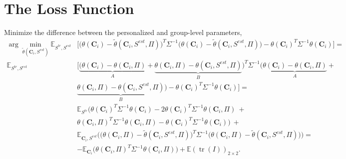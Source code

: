 \documentclass[12pt]{article}
\begin{document}
\section{The Loss Function}\label{app_loss}
Minimize the difference between the personalized and group-level parameters, 
\begin{align} \label{eq_loss}
   \arg\min_{\widetilde{\theta}(\mathbf{C}_i, S^{est})}  \mathbb{E}_{S^{tr}, S^{est}} & \bigg[\big(\theta(\mathbf{C}_i) - \widetilde{\theta}(\mathbf{C}_i, S^{est}, \Pi)\big)^T\Sigma^{-1}\big(\theta(\mathbf{C}_i) - \widetilde{\theta}(\mathbf{C}_i, S^{est}, \Pi)\big) - \theta(\mathbf{C}_i)^T\Sigma^{-1}\theta(\mathbf{C}_i)\bigg]  = \\
    \mathbb{E}_{S^{tr}, S^{est}}& \bigg[\underbrace{\big(\theta(\mathbf{C}_i) - \theta(\mathbf{C}_i, \Pi)}_{A} + \underbrace{\theta(\mathbf{C}_i, \Pi) -  \theta(\mathbf{C}_i, S^{est}, \Pi)}_{B}\big)^T\Sigma^{-1}\big(\underbrace{\theta(\mathbf{C}_i) - \theta(\mathbf{C}_i, \Pi)}_{A} + \nonumber\\
    & \underbrace{\theta(\mathbf{C}_i, \Pi) - \theta(\mathbf{C}_i, S^{est}, \Pi)}_{B}\big)- \theta(\mathbf{C}_i)^T\Sigma^{-1}\theta(\mathbf{C}_i)\bigg] = \\ \nonumber
    & \mathbb{E}_{S^{tr}}\bigg ( \theta(\mathbf{C}_i)^T\Sigma^{-1}\theta(\mathbf{C}_i) - 2\theta(\mathbf{C}_i)^T\Sigma^{-1}\theta(\mathbf{C}_i, \Pi) \  + \nonumber \\
    &\theta(\mathbf{C}_i, \Pi)^T\Sigma^{-1}\theta(\mathbf{C}_i, \Pi)  
    - \theta(\mathbf{C}_i)^T\Sigma^{-1}\theta(\mathbf{C}_i)\bigg)  \ + \\
    & \mathbb{E}_{\mathbf{C}_i, S^{est}}\bigg(\big(\theta(\mathbf{C}_i, \Pi) - \widetilde{\theta}(\mathbf{C}_i, S^{est}, \Pi)\big)^T\Sigma^{-1}\big(\theta(\mathbf{C}_i, \Pi) - \widetilde{\theta}(\mathbf{C}_i, S^{est}, \Pi)\big)\bigg) = \\
    & -\mathbb{E}_{\mathbf{C}_i}\big(\theta(\mathbf{C}_i, \Pi)^T\Sigma^{-1}\theta(\mathbf{C}_i, \Pi)\big) + \mathbb{E}(\operatorname{tr}(I))_{2 \times 2}.
\end{align}
\end{document}
